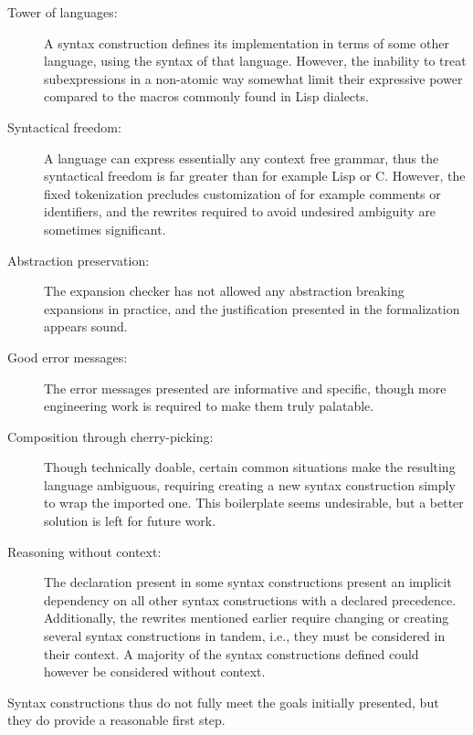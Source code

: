 \documentclass{kththesis}
\begin{document}
\begin{description}
  \item[Tower of languages:] A syntax construction defines its implementation in terms of some other language, using the syntax of that language. However, the inability to treat subexpressions in a non-atomic way somewhat limit their expressive power compared to the macros commonly found in Lisp dialects.

  \item[Syntactical freedom:] A language can express essentially any context free grammar, thus the syntactical freedom is far greater than for example Lisp or C. However, the fixed tokenization precludes customization of for example comments or identifiers, and the rewrites required to avoid undesired ambiguity are sometimes significant.

  \item[Abstraction preservation:] The expansion checker has not allowed any abstraction breaking expansions in practice, and the justification presented in the formalization appears sound.

  \item[Good error messages:] The error messages presented are informative and specific, though more engineering work is required to make them truly palatable.

  \item[Composition through cherry-picking:] Though technically doable, certain common situations make the resulting language ambiguous, requiring creating a new syntax construction simply to wrap the imported one. This boilerplate seems undesirable, but a better solution is left for future work.

  \item[Reasoning without context:] The  declaration present in some syntax constructions present an implicit dependency on all other syntax constructions with a declared precedence. Additionally, the rewrites mentioned earlier require changing or creating several syntax constructions in tandem, i.e., they must be considered in their context. A majority of the syntax constructions defined could however be considered without context.
\end{description}

Syntax constructions thus do not fully meet the goals initially presented, but they do provide a reasonable first step.

\printbibliography[heading=bibintoc]

\appendix
\end{document}
